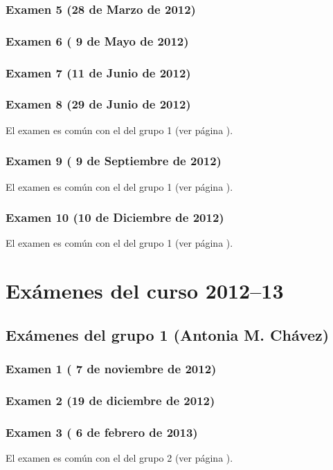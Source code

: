 \documentclass[a4paper,12pt,twoside]{book}
\begin{document}
\subsection{Examen 5 (28 de Marzo de 2012)}
\subsection{Examen 6 ( 9 de Mayo de 2012)}
\subsection{Examen 7 (11 de Junio de 2012)}
\subsection{Examen 8 (29 de Junio de 2012)} 
El examen es común con el del grupo 1 (ver página \pageref{examen_11_12_1_8}).
\subsection{Examen 9 ( 9 de Septiembre de 2012)} 
El examen es común con el del grupo 1 (ver página \pageref{examen_11_12_1_9}).
\subsection{Examen 10 (10 de Diciembre de 2012)} 
El examen es común con el del grupo 1 (ver página \pageref{examen_11_12_1_10}).

\chapter{Exámenes del curso 2012--13}
\section{Exámenes del grupo 1 (Antonia M. Chávez)}
\subsection{Examen 1 ( 7 de noviembre de 2012)}
\subsection{Examen 2 (19 de diciembre de 2012)}
\subsection{Examen 3 ( 6 de febrero de 2013)}
El examen es común con el del grupo 2 (ver página \pageref{examen_12_13_2_3}).
\end{document}
